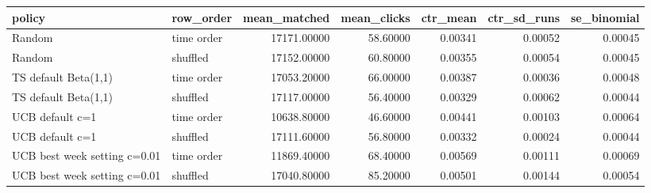 \begin{tabular}{llrrrrr}
\toprule
policy & row\_order & mean\_matched & mean\_clicks & ctr\_mean & ctr\_sd\_runs & se\_binomial \\
\midrule
Random & time order & 17171.00000 & 58.60000 & 0.00341 & 0.00052 & 0.00045 \\
Random & shuffled & 17152.00000 & 60.80000 & 0.00355 & 0.00054 & 0.00045 \\
TS default Beta(1,1) & time order & 17053.20000 & 66.00000 & 0.00387 & 0.00036 & 0.00048 \\
TS default Beta(1,1) & shuffled & 17117.00000 & 56.40000 & 0.00329 & 0.00062 & 0.00044 \\
UCB default c=1 & time order & 10638.80000 & 46.60000 & 0.00441 & 0.00103 & 0.00064 \\
UCB default c=1 & shuffled & 17111.60000 & 56.80000 & 0.00332 & 0.00024 & 0.00044 \\
UCB best week setting c=0.01 & time order & 11869.40000 & 68.40000 & 0.00569 & 0.00111 & 0.00069 \\
UCB best week setting c=0.01 & shuffled & 17040.80000 & 85.20000 & 0.00501 & 0.00144 & 0.00054 \\
\bottomrule
\end{tabular}

